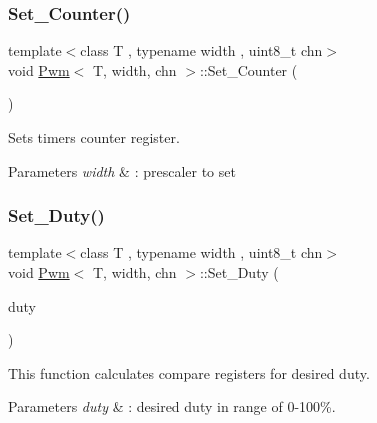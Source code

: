 \subsubsection{\texorpdfstring{Set\_Counter()}{Set\_Counter()}}
{\footnotesize\ttfamily template$<$class T , typename width , uint8\+\_\+t chn$>$ \\
void \mbox{\hyperlink{class_pwm}{Pwm}}$<$ T, width, chn $>$\+::Set\+\_\+\+Counter (\begin{DoxyParamCaption}\item[{width}]{ }\end{DoxyParamCaption})}



Sets timer\textquotesingle{}s counter register. 


\begin{DoxyParams}{Parameters}
{\em width} & \+: prescaler to set \\
\hline
\end{DoxyParams}
\mbox{\label{class_pwm_a00bcd1145b497918ad9bb06e6b8c35e2}} 
\subsubsection{\texorpdfstring{Set\_Duty()}{Set\_Duty()}}
{\footnotesize\ttfamily template$<$class T , typename width , uint8\+\_\+t chn$>$ \\
void \mbox{\hyperlink{class_pwm}{Pwm}}$<$ T, width, chn $>$\+::Set\+\_\+\+Duty (\begin{DoxyParamCaption}\item[{uint8\+\_\+t}]{duty }\end{DoxyParamCaption})\hspace{0.3cm}{\ttfamily [inline]}}



This function calculates compare registers for desired duty. 


\begin{DoxyParams}{Parameters}
{\em duty} & \+: desired duty in range of 0-\/100\%. \\
\hline
\end{DoxyParams}
\mbox{\label{class_pwm_a0d63f768270057d153984dec2a64c3e2}} 
